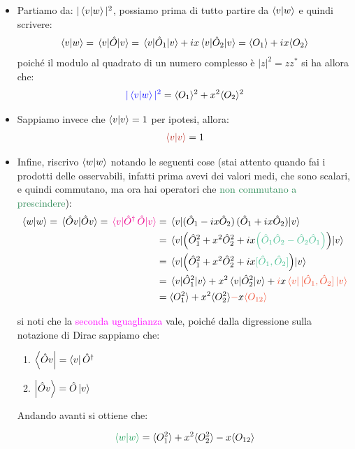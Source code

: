 \begin{itemize}
	\item Partiamo da: $|\braket{v}{w}|^2$, possiamo prima di tutto partire da $\braket{v}{w}$ e quindi scrivere:
\begin{align*}
	\braket{v}{w} = \mel{v}{\hat{O}}{v} = \mel{v}{\hat{O}_1}{v} + ix \mel{v}{\hat{O}_2}{v} = \langle O_1 \rangle + ix \langle O_2 \rangle 
\end{align*}
	poiché il modulo al quadrato di un numero complesso è $|z|^2 = zz^*$ si ha allora che:
\begin{align*}
	\textcolor{blue}{|\braket{v}{w}|^2} = \langle O_1 \rangle^2 + x^2 \langle O_2 \rangle^2 
\end{align*}

	\item Sappiamo invece che $\braket{v} = 1$ per ipotesi, allora:
	\begin{align*}
		\textcolor{BrickRed}{\braket{v} }= 1
	\end{align*}
	
	\item Infine, riscrivo $\braket{w}$ notando le seguenti cose (stai attento quando fai i prodotti delle osservabili, infatti prima avevi dei valori medi, che sono scalari, e quindi commutano, ma ora hai operatori che \textcolor{SeaGreen}{non commutano a prescindere}):
	\begin{align*}
		\braket{w} = \braket*{\hat{O}v} = \textcolor{Magenta}{\mel{v}{\hat{O}^{\dagger}\, \hat{O} }{v}} &= \mel{v}{(\hat{O}_1 - ix \hat{O}_2) \, (\hat{O}_1 + ix \hat{O}_2)}{v} \\
		&= \mel{v}{\qty(\hat{O}^2_1 + x^2 \hat{O}^2_2 + ix\textcolor{SeaGreen}{\qty(\hat{O}_1\hat{O}_2 - \hat{O}_2\hat{O}_1)})}{v} \\
		&= \mel{v}{\qty(\hat{O}^2_1 + x^2 \hat{O}^2_2 + ix\textcolor{SeaGreen}{[\hat{O}_1, \hat{O}_2]})}{v} \\
		&= \mel{v}{\hat{O}^2_1}{v} + x^2 \mel{v}{\hat{O}^2_2}{v} +\textcolor{RedOrange}{ i}x  \textcolor{RedOrange}{\mel{v}{ \, [\hat{O}_1, \hat{O}_2 ] \, }{v}} \\
		&= \mean{O^2_1} + x^2\mean{O_2^2} \textcolor{RedOrange}{-}x\textcolor{RedOrange}{\mean{O_{12}}}
	\end{align*}
	
		si noti che la \textcolor{Magenta}{seconda uguaglianza} vale, poiché dalla digressione sulla notazione di Dirac sappiamo che:
	
\begin{enumerate}[label=\arabic*)]
	\item $\bra{\hat{O}v} = \bra{v} \hat{O}^{\dagger}$
	\item $\ket{\hat{O}v} = \hat{O} \ket{v} $
\end{enumerate}
		Andando avanti si ottiene che:
	
	\begin{align*}
		\textcolor{ForestGreen}{\braket{w}} = \mean{O^2_1} + x^2\mean{O_2^2} -x\mean{O_{12}}
	\end{align*}
\end{itemize}
	
